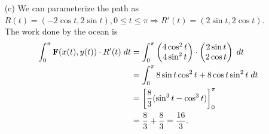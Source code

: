 \documentclass{article}
\begin{document}
\begin{enumerate}
\begin{enumerate}
        \vspace{1cm}
        \item[(c)] We can parameterize the path as $R(t) = (-2\cos t, 2\sin t) , 0\le t \le \pi \Rightarrow R'(t) = (2\sin t, 2\cos t)$.\\
        The work done by the ocean is
        \begin{align*}
            \int_0^\pi \textbf{F}(x(t), y(t))\cdot R'(t) \hspace{1mm}dt &= \int_0^\pi \begin{pmatrix} 4\cos^2 t \\ 4\sin^2 t \end{pmatrix} \cdot \begin{pmatrix} 2\sin t \\ 2\cos t \end{pmatrix} \hspace{1mm}dt\\
            &= \int_0^\pi 8\sin t\cos^2 t + 8\cos t\sin^2 t \hspace{1mm}dt\\
            &= \left[\frac{8}{3}(\sin^3 t - \cos^3 t)\right]_0^\pi\\
            &= \frac{8}{3} + \frac{8}{3} = \frac{16}{3}.
        \end{align*}
    \end{enumerate}
    

\end{enumerate}
\end{document}
